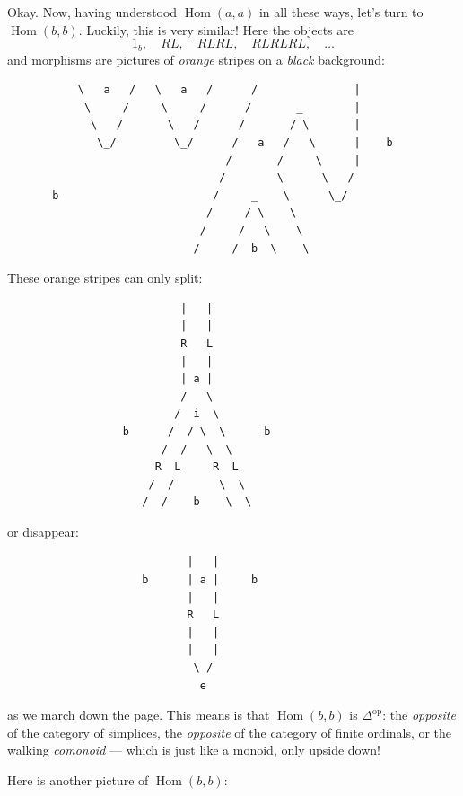 \documentclass{article}
\begin{document}
Okay. Now, having understood \(\operatorname{Hom}(a,a)\) in all these
ways, let's turn to \(\operatorname{Hom}(b,b)\). Luckily, this is very
similar! Here the objects are
\[1_b,\quad RL,\quad RLRL,\quad RLRLRL,\quad \ldots\] and morphisms are
pictures of \emph{orange} stripes on a \emph{black} background:

\begin{verbatim}
           \   a   /   \   a   /      /               |
            \     /     \     /      /       _        |
             \   /       \   /      /       / \       |
              \_/         \_/      /   a   /   \      |    b
                                  /       /     \     |
                                 /        \      \   / 
       b                        /     _    \      \_/ 
                               /     / \    \      
                              /     /   \    \       
                             /     /  b  \    \  
\end{verbatim}

These orange stripes can only split:

\begin{verbatim}
                           |   |
                           |   |   
                           R   L
                           |   |
                           | a |
                           /   \                           
                          /  i  \
                  b      /  / \  \      b
                        /  /   \  \
                       R  L     R  L
                      /  /       \  \
                     /  /    b    \  \ 
\end{verbatim}

or disappear:

\begin{verbatim}
                            |   |    
                     b      | a |     b 
                            |   |
                            R   L   
                            |   |
                            |   |
                             \ /
                              e
\end{verbatim}

as we march down the page. This means is that
\(\operatorname{Hom}(b,b)\) is \(\Delta^{\mathrm{op}}\): the
\emph{opposite} of the category of simplices, the \emph{opposite} of the
category of finite ordinals, or the walking \emph{comonoid} --- which is
just like a monoid, only upside down!

Here is another picture of \(\operatorname{Hom}(b,b)\):
\end{document}
